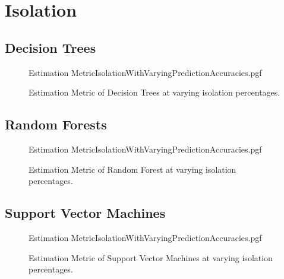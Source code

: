 \chapter{Isolation}
\label{chap:Isolation}


\section{Decision Trees}
\begin{figure}[!htb]
	\centering
	{Estimation MetricIsolationWithVaryingPredictionAccuracies.pgf}
	
	\caption{Estimation Metric of Decision Trees at varying isolation percentages.}
	\label{fig:DecisionTreesWithVaryingPredictionEstimation}
\end{figure}

%	

\section{Random Forests}
\begin{figure}[!htb]
	\centering
	{Estimation MetricIsolationWithVaryingPredictionAccuracies.pgf}
	
	\caption{Estimation Metric of Random Forest at varying isolation percentages.}
	\label{fig:RandomForestWithVaryingPredictionEstimation}
\end{figure}

%	

\section{Support Vector Machines}
\begin{figure}[!htb]
	\centering
	{Estimation MetricIsolationWithVaryingPredictionAccuracies.pgf}
	
	\caption{Estimation Metric of Support Vector Machines at varying isolation percentages.}
	\label{fig:SVMWithVaryingPredictionEstimation}
\end{figure}

